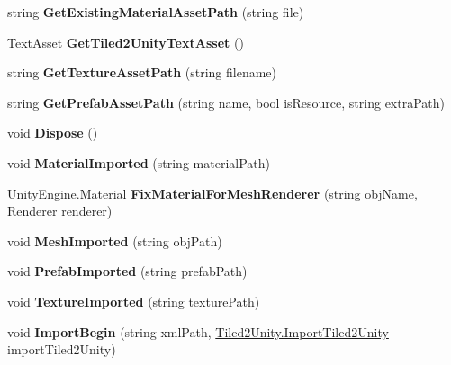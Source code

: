\begin{DoxyCompactItemize}
string {\bfseries Get\+Existing\+Material\+Asset\+Path} (string file)
\item 
\mbox{\label{class_tiled2_unity_1_1_import_tiled2_unity_ab518dfb851c9b8ae02c942d568e12326}} 
Text\+Asset {\bfseries Get\+Tiled2\+Unity\+Text\+Asset} ()
\item 
\mbox{\label{class_tiled2_unity_1_1_import_tiled2_unity_af199d19db0fbbe7f5836633e6fa8f798}} 
string {\bfseries Get\+Texture\+Asset\+Path} (string filename)
\item 
\mbox{\label{class_tiled2_unity_1_1_import_tiled2_unity_ac1f0dc4fd45b213327c3085bc0c38038}} 
string {\bfseries Get\+Prefab\+Asset\+Path} (string name, bool is\+Resource, string extra\+Path)
\item 
\mbox{\label{class_tiled2_unity_1_1_import_tiled2_unity_aa2193f54b0c54f4be6f7077668061fce}} 
void {\bfseries Dispose} ()
\item 
\mbox{\label{class_tiled2_unity_1_1_import_tiled2_unity_abe871380459e1120c54c920b63725a5a}} 
void {\bfseries Material\+Imported} (string material\+Path)
\item 
\mbox{\label{class_tiled2_unity_1_1_import_tiled2_unity_a40bfd0211731100d0d36d8ad94f2974e}} 
Unity\+Engine.\+Material {\bfseries Fix\+Material\+For\+Mesh\+Renderer} (string obj\+Name, Renderer renderer)
\item 
\mbox{\label{class_tiled2_unity_1_1_import_tiled2_unity_a58536db75e369597819f10abd676f74c}} 
void {\bfseries Mesh\+Imported} (string obj\+Path)
\item 
\mbox{\label{class_tiled2_unity_1_1_import_tiled2_unity_a76f2e7873d1ca6242e309de2ee8c6955}} 
void {\bfseries Prefab\+Imported} (string prefab\+Path)
\item 
\mbox{\label{class_tiled2_unity_1_1_import_tiled2_unity_ad4f3e0e6fa83359316fa547ceae92b8c}} 
void {\bfseries Texture\+Imported} (string texture\+Path)
\item 
\mbox{\label{class_tiled2_unity_1_1_import_tiled2_unity_ab59e3ca83b03c07989eec10f347e96bf}} 
void {\bfseries Import\+Begin} (string xml\+Path, \mbox{\hyperlink{class_tiled2_unity_1_1_import_tiled2_unity}{Tiled2\+Unity.\+Import\+Tiled2\+Unity}} import\+Tiled2\+Unity)
\end{DoxyCompactItemize}


